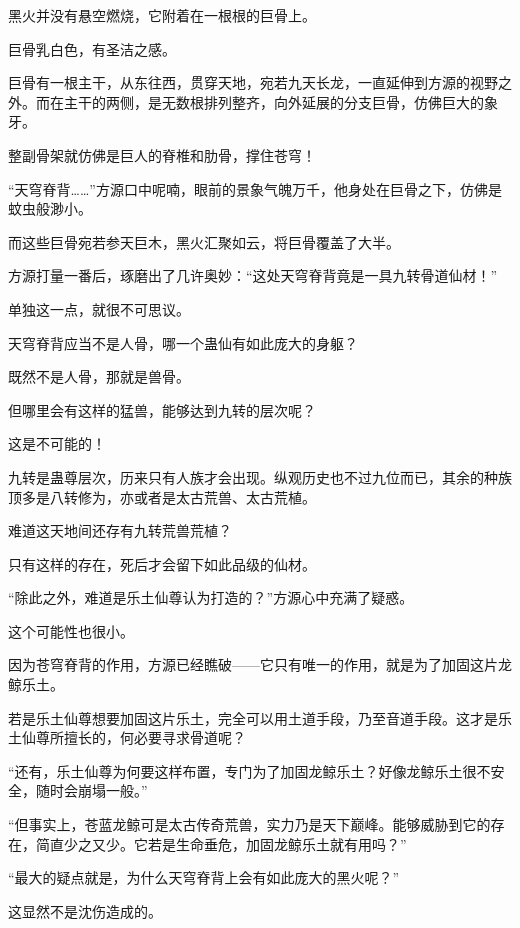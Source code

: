 
\begin{this_body}

黑火并没有悬空燃烧，它附着在一根根的巨骨上。

巨骨乳白色，有圣洁之感。

巨骨有一根主干，从东往西，贯穿天地，宛若九天长龙，一直延伸到方源的视野之外。而在主干的两侧，是无数根排列整齐，向外延展的分支巨骨，仿佛巨大的象牙。

整副骨架就仿佛是巨人的脊椎和肋骨，撑住苍穹！

“天穹脊背……”方源口中呢喃，眼前的景象气魄万千，他身处在巨骨之下，仿佛是蚊虫般渺小。

而这些巨骨宛若参天巨木，黑火汇聚如云，将巨骨覆盖了大半。

方源打量一番后，琢磨出了几许奥妙：“这处天穹脊背竟是一具九转骨道仙材！”

单独这一点，就很不可思议。

天穹脊背应当不是人骨，哪一个蛊仙有如此庞大的身躯？

既然不是人骨，那就是兽骨。

但哪里会有这样的猛兽，能够达到九转的层次呢？

这是不可能的！

九转是蛊尊层次，历来只有人族才会出现。纵观历史也不过九位而已，其余的种族顶多是八转修为，亦或者是太古荒兽、太古荒植。

难道这天地间还存有九转荒兽荒植？

只有这样的存在，死后才会留下如此品级的仙材。

“除此之外，难道是乐土仙尊认为打造的？”方源心中充满了疑惑。

这个可能性也很小。

因为苍穹脊背的作用，方源已经瞧破——它只有唯一的作用，就是为了加固这片龙鲸乐土。

若是乐土仙尊想要加固这片乐土，完全可以用土道手段，乃至音道手段。这才是乐土仙尊所擅长的，何必要寻求骨道呢？

“还有，乐土仙尊为何要这样布置，专门为了加固龙鲸乐土？好像龙鲸乐土很不安全，随时会崩塌一般。”

“但事实上，苍蓝龙鲸可是太古传奇荒兽，实力乃是天下巅峰。能够威胁到它的存在，简直少之又少。它若是生命垂危，加固龙鲸乐土就有用吗？”

“最大的疑点就是，为什么天穹脊背上会有如此庞大的黑火呢？”

这显然不是沈伤造成的。


\end{this_body}

